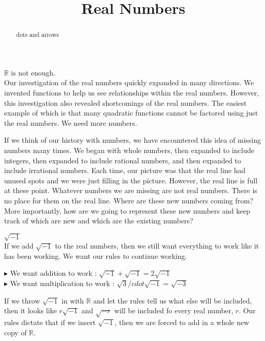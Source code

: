 \documentclass{ximera}
\title{Real Numbers}
\begin{document}
\begin{abstract}
dots and arrows
\end{abstract}
\maketitle



\textbf{$\mathbb{R}$} is not enough.  \\



Our investigation of the real numbers quickly expanded in many directions. We invented functions to help us see relationships within the real numbers.  However, this investigation also revealed shortcomings of the real numbers. The easiest example of which is that many quadratic functions cannot be factored using just the real numbers. We need more numbers.


If we think of our history with numbers, we have encountered this idea of missing numbers many times.  We began with whole numbers, then expanded to include integers, then expanded to include rational numbers, and then expanded to include irrational numbers.  Each time, our picture was that the real line had unused spots and we were just filling in the picture.  However, the real line is full at these point. Whatever numbers we are missing are not real numbers.  There is no place for them on the real line.  Where are these new numbers coming from? More importantly, how are we going to represent these new numbers and keep track of which are new and which are the existing numbers?


\begin{idea} \textbf{\textcolor{green!50!black}{$\sqrt{-1}$}} \\


If we add $\sqrt{-1}$ to the real numbers, then we still want everything to work like it has been working.  We want our rules to continue working.


$\blacktriangleright$ We want addition to work : $\sqrt{-1} + \sqrt{-1} = 2\sqrt{-1}$ \\

$\blacktriangleright$ We want multiplication to work : $\sqrt{3} /cdot \sqrt{-1} = \sqrt{-3}$ \\


\end{idea}


If we throw $\sqrt{-1}$ in with $\mathbb{R}$ and let the rules tell us what else will be included, then it looks like $r\sqrt{-1}$ and $\sqrt{-r}$ will be included fo every real number, $r$.  Our rules dictate that if we insert $\sqrt{-1}$, then we are forced to add in a whole new copy of $\mathbb{R}$.
\end{document}
